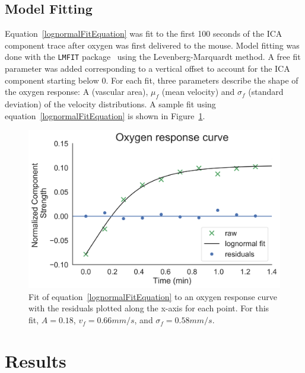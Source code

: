 \subsection{Model Fitting}
\label{sec:lognormalfitting_methods}
Equation~\ref{lognormalFitEquation} was fit to the first 100 seconds of the \acs{ICA} component trace after oxygen was first delivered to the mouse. 
Model fitting was done with the \texttt{LMFIT} package~\cite{Newville:2019jt} using the Levenberg-Marquardt method.
A free fit parameter was added corresponding to a vertical offset to account for the \acs{ICA} component starting below 0. 
For each fit, three parameters describe the shape of the oxygen response: A (vascular area), $\mu_f$ (mean velocity) and $\sigma_f$ (standard deviation) of the velocity distributions.
A sample fit using equation~\ref{lognormalFitEquation} is shown in Figure~\ref{fig:lognormal_sample}.

\begin{figure}[htbp]
   \centering
   \includegraphics[width=\textwidth]{oemri_thesis2/oemri_thesis2-images/technical_SampleFit.png} %
   \caption{Fit of equation~\ref{lognormalFitEquation} to an oxygen response curve with the residuals plotted along the x-axis for each point.
   For this fit, $A= 0.18$, $v_f = 0.66 mm/s$, and $\sigma_f = 0.58 mm/s$.}
   \label{fig:lognormal_sample}
\end{figure}

\section{Results}
